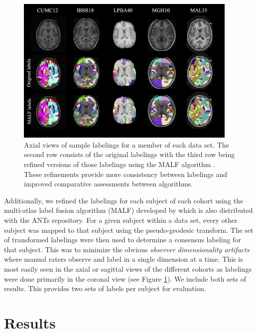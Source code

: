 \documentclass{frontiersSCNS}
\begin{document}
\begin{figure}[htb]
  \centering
  \includegraphics[width=0.95\textwidth]{labels.jpg}
  \caption{Axial views of sample labelings for a member of each data set.  
  The second row consists of the original labelings with the third row being
  refined versions of those labelings using the MALF algorithm \cite{wang2012}.
  These refinements provide more consistency between labelings and improved
  comparative assessments between algorithms.
  }
  \label{fig:labels}
\end{figure}

Additionally, we refined the labelings for each subject of each cohort
using the multi-atlas label fusion algorithm (MALF) developed by \cite{wang2012}
which is also distributed with the ANTs repository.
For a given subject within a data set, every other subject was mapped to 
that subject using the pseudo-geodesic transform.  The set of transformed labelings 
were then used to determine a consensus
labeling for that subject.
This was to minimize the obvious {\it observer dimensionality artifacts} where manual
raters observe and label in a single dimension at a time.  This
is most easily seen in the axial or sagittal views of the different cohorts 
as labelings were done primarily in the coronal view (see Figure \ref{fig:labels}).  
We include both sets of results.  This provides two sets of labels per subject
for evaluation.



\section{Results}
\end{document}
